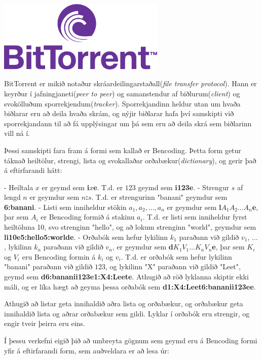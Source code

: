 
\includegraphics[width=0.6\textwidth]{bittorrent.jpg}

BitTorrent er mikið notaður skráardeilingarstaðall(\textit{file transfer
protocol}). Hann er keyrður í jafningjaneti(\textit{peer to
peer}) og samanstendur af biðlurum(\textit{client}) og svokölluðum sporrekjendum(\textit{tracker}). Sporrekjandinn heldur utan um hvaða
biðlarar eru að deila hvaða skrám, og nýjir biðlarar hafa því samskipti við
sporrekjandann til að fá upplýsingar um þá sem eru að deila skrá sem biðlarinn
vill ná í.

Þessi samskipti fara fram á formi sem kallað er Bencoding. Þetta form getur
táknað heiltölur, strengi, lista og svokallaðar orðabækur(\textit{dictionary}), og gerir það á eftirfarandi hátt:

- Heiltala $x$ er geymd sem \textbf{i}$x$\textbf{e}. T.d. er $123$ geymd sem \textbf{i123e}.
- Strengur $s$ af lengd $n$ er geymdur sem $n$\textbf{:}$s$. T.d. er strengurinn
  "banani" geymdur sem \textbf{6:banani}.
- Listi sem inniheldur stökin $a_1, a_2, \ldots, a_n$ er geymdur sem
  \textbf{l}$A_1$$A_2$$\ldots$$A_n$\textbf{e}, þar sem $A_i$ er Bencoding formið á
  stakinu $a_i$. T.d. er listi sem inniheldur fyrst heiltöluna 10, svo
  strenginn "hello", og að lokum strenginn "world", geymdur sem
  \textbf{li10e5:hello5:worlde}.
- Orðabók sem hefur lykilinn $k_1$ paraðann við gildið $v_1$, $\ldots$,
  lykilinn $k_n$ paraðann við gildið $v_n$, er geymdur sem
  \textbf{d}$K_1$$V_1$$\ldots$$K_n$$V_n$\textbf{e}, þar sem $K_i$ og $V_i$ eru Bencoding
  formin á $k_i$ og $v_i$. T.d. er orðabók sem hefur lykilinn "banani" paraðann
  við gildið $123$, og lykilinn "X" paraðann við gildið "Leet", geymd sem
  \textbf{d6:bananii123e1:X4:Leete}. Athugið að röð lyklanna skiptir ekki máli, og
  er líka hægt að geyma þessa orðabók sem \textbf{d1:X4:Leet6:bananii123ee}.

Athugið að listar geta innihaldið aðra lista og orðabækur, og orðabækur geta
innihaldið lista og aðrar orðabækur sem gildi. Lyklar í orðabók eru strengir,
og engir tveir þeirra eru eins.

Í þessu verkefni eigið þið að umbreyta gögnum sem geymd eru á Bencoding formi
yfir á eftirfarandi form, sem auðveldara er að lesa úr:

